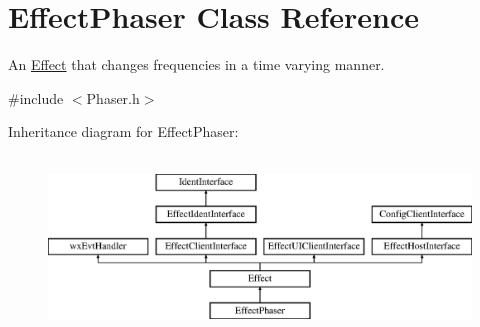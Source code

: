 \hypertarget{class_effect_phaser}{}\section{Effect\+Phaser Class Reference}
\label{class_effect_phaser}


An \hyperlink{class_effect}{Effect} that changes frequencies in a time varying manner.  




{\ttfamily \#include $<$Phaser.\+h$>$}

Inheritance diagram for Effect\+Phaser\+:\begin{figure}[H]
\begin{center}
\leavevmode
\includegraphics[height=4.794520cm]{class_effect_phaser}
\end{center}
\end{figure}
